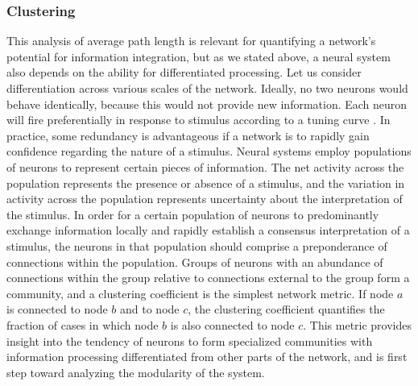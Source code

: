 \subsubsection{Clustering}
This analysis of average path length is relevant for quantifying a network's potential for information integration, but as we stated above, a neural system also depends on the ability for differentiated processing. Let us consider differentiation across various scales of the network. Ideally, no two neurons would behave identically, because this would not provide new information. Each neuron will fire preferentially in response to stimulus according to a tuning curve \cite{daab2001}. In practice, some redundancy is advantageous if a network is to rapidly gain confidence regarding the nature of a stimulus. Neural systems employ populations of neurons to represent certain pieces of information. The net activity across the population represents the presence or absence of a stimulus, and the variation in activity across the population represents uncertainty about the interpretation of the stimulus. In order for a certain population of neurons to predominantly exchange information locally and rapidly establish a consensus interpretation of a stimulus, the neurons in that population should comprise a preponderance of connections within the population. Groups of neurons with an abundance of connections within the group relative to connections external to the group form a community, and a clustering coefficient \cite{eskn2014,fa2007} is the simplest network metric. If node $a$ is connected to node $b$ and to node $c$, the clustering coefficient quantifies the fraction of cases in which node $b$ is also connected to node $c$. This metric provides insight into the tendency of neurons to form specialized communities with information processing differentiated from other parts of the network, and is first step toward analyzing the modularity of the system. 

